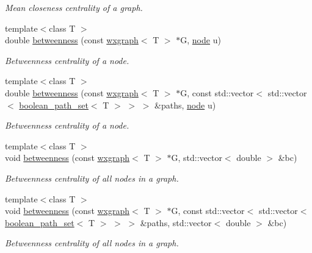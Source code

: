 \begin{DoxyCompactItemize}
\begin{DoxyCompactList}\small\item\em Mean closeness centrality of a graph. \end{DoxyCompactList}\item 
{\footnotesize template$<$class T $>$ }\\double \hyperlink{namespacelgraph_1_1networks_1_1metrics_1_1centralities_a5a8a94d9361a49ffa657d8d6541be4be}{betweenness} (const \hyperlink{classlgraph_1_1wxgraph}{wxgraph}$<$ T $>$ $\ast$G, \hyperlink{namespacelgraph_a397169dd66adf725210a30fb7251773e}{node} u)
\begin{DoxyCompactList}\small\item\em Betweenness centrality of a node. \end{DoxyCompactList}\item 
{\footnotesize template$<$class T $>$ }\\double \hyperlink{namespacelgraph_1_1networks_1_1metrics_1_1centralities_a22d289500772bb1c1c40f705f8cfcdf0}{betweenness} (const \hyperlink{classlgraph_1_1wxgraph}{wxgraph}$<$ T $>$ $\ast$G, const std\+::vector$<$ std\+::vector$<$ \hyperlink{namespacelgraph_afad432931ba600ab1628d5c9595986c5}{boolean\+\_\+path\+\_\+set}$<$ T $>$ $>$ $>$ \&paths, \hyperlink{namespacelgraph_a397169dd66adf725210a30fb7251773e}{node} u)
\begin{DoxyCompactList}\small\item\em Betweenness centrality of a node. \end{DoxyCompactList}\item 
{\footnotesize template$<$class T $>$ }\\void \hyperlink{namespacelgraph_1_1networks_1_1metrics_1_1centralities_adbfe6a6a80259a6c75c63ca60813b0f8}{betweenness} (const \hyperlink{classlgraph_1_1wxgraph}{wxgraph}$<$ T $>$ $\ast$G, std\+::vector$<$ double $>$ \&bc)
\begin{DoxyCompactList}\small\item\em Betweenness centrality of all nodes in a graph. \end{DoxyCompactList}\item 
{\footnotesize template$<$class T $>$ }\\void \hyperlink{namespacelgraph_1_1networks_1_1metrics_1_1centralities_aef9634512e57101c088177e0875ed937}{betweenness} (const \hyperlink{classlgraph_1_1wxgraph}{wxgraph}$<$ T $>$ $\ast$G, const std\+::vector$<$ std\+::vector$<$ \hyperlink{namespacelgraph_afad432931ba600ab1628d5c9595986c5}{boolean\+\_\+path\+\_\+set}$<$ T $>$ $>$ $>$ \&paths, std\+::vector$<$ double $>$ \&bc)
\begin{DoxyCompactList}\small\item\em Betweenness centrality of all nodes in a graph. \end{DoxyCompactList}\end{DoxyCompactItemize}


